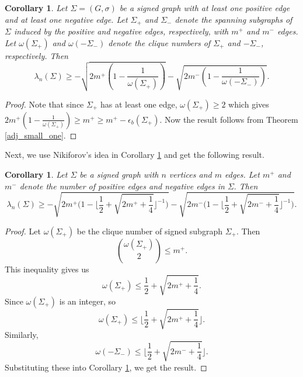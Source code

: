 \documentclass[12pt]{article}
\theoremstyle{plain}
\newtheorem{corollary}[theorem]{Corollary}
\numberwithin{equation}{section}
\begin{document}
	\begin{corollary}\label{adj_small_two}
		Let $\Sigma=(G,\sigma)$ be a signed graph with at least one positive edge and at least one negative edge. Let $\Sigma_{+}$ and $\Sigma_{-}$ denote the spanning subgraphs of $\Sigma$ induced by the positive and negative edges, respectively, with $m^{+}$ and $m^{-}$ edges. Let $\omega(\Sigma_{+})$ and $\omega(-\Sigma_{-})$ denote the clique numbers of $\Sigma_{+}$ and $-\Sigma_{-}$, respectively. Then
		\[
		\lambda_{n}(\Sigma)\geq
		-\sqrt{2m^{+}\left(1-\frac{1}{\omega(\Sigma_{+})}\right)}
		-\sqrt{2m^{-}\left(1-\frac{1}{\omega(-\Sigma_{-})}\right)}.
		\]
		
	\end{corollary}
	\begin{proof}
		Note that since $\Sigma_+$ has at least one edge, $\omega(\Sigma_+) \geq 2$ which gives $2m^{+}\left(1-\frac{1}{\omega(\Sigma_{+})}\right) \geq m^+ \geq m^+ - \epsilon_b(\Sigma_+)$. Now the result follows from Theorem \ref{adj_small_one}.
	\end{proof}
	Next, we use Nikiforov's idea in Corollary \ref{adj_small_two} and get the following result.
	\begin{corollary}
		Let $\Sigma$ be a signed graph with $n$ vertices and $m$ edges. Let $m^{+}$ and $m^{-}$ denote the number of positive edges and negative edges in $\Sigma.$ Then
		\[\lambda_{n}(\Sigma)\geq  -\sqrt{2m^{+}\Bigg(1-\Big\lfloor\frac{1}{2}+\sqrt{2m^{+}+\frac{1}{4}}\Big\rfloor^{-1}\Bigg)}-\sqrt{2m^{-}\Bigg(1-\Big\lfloor\frac{1}{2}+\sqrt{2m^{-}+\frac{1}{4}}\Big\rfloor^{-1}\Bigg)}.\]
	\end{corollary}
	\begin{proof}
		Let $\omega(\Sigma_{+})$ be the clique number of signed subgraph $\Sigma_{+}$. Then \[\binom{\omega(\Sigma_{+})}{2}\leq m^{+}.\]  This inequality gives us \[\omega(\Sigma_{+})\leq \frac{1}{2}+\sqrt{2m^{+}+\frac{1}{4}}.\]
		Since $\omega(\Sigma_{+})$ is an integer, so \[\omega(\Sigma_{+})\leq \Big\lfloor\frac{1}{2}+\sqrt{2m^{+}+\frac{1}{4}}\Big\rfloor.\]
		Similarly, \[\omega(-\Sigma_{-})\leq \Big\lfloor\frac{1}{2}+\sqrt{2m^{-}+\frac{1}{4}}\Big\rfloor.\]
		Substituting these into Corollary \ref{adj_small_two}, we get the result.
	\end{proof}
	
\end{document}
